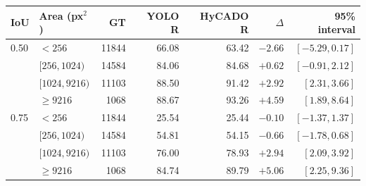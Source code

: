 \begin{tabular}{llrrrrr}
\toprule
IoU & Area (px$^2$) & GT & YOLO R & HyCADO R & $\Delta$ & 95\% interval\\
\midrule
0.50 & $<256$ & 11844 & 66.08 & 63.42 & $-2.66$ & $[-5.29, 0.17]$\\
 & $[256,1024)$ & 14584 & 84.06 & 84.68 & $+0.62$ & $[-0.91, 2.12]$\\
 & $[1024,9216)$ & 11103 & 88.50 & 91.42 & $+2.92$ & $[2.31, 3.66]$\\
 & $\geq 9216$ & 1068 & 88.67 & 93.26 & $+4.59$ & $[1.89, 8.64]$\\
0.75 & $<256$ & 11844 & 25.54 & 25.44 & $-0.10$ & $[-1.37, 1.37]$\\
 & $[256,1024)$ & 14584 & 54.81 & 54.15 & $-0.66$ & $[-1.78, 0.68]$\\
 & $[1024,9216)$ & 11103 & 76.00 & 78.93 & $+2.94$ & $[2.09, 3.92]$\\
 & $\geq 9216$ & 1068 & 84.74 & 89.79 & $+5.06$ & $[2.25, 9.36]$\\
\bottomrule
\end{tabular}
